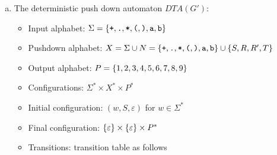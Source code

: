 \begin{solution}
\begin{enumerate}[(a)]

\item The deterministic push down automaton $DTA(G')$:
\begin{itemize}
  \item Input alphabet: $\Sigma = \left\{ \texttt{+}, \texttt{.}, \texttt{*}, \texttt{(}, \texttt{)}, \texttt{a}, \texttt{b} \right\}$
  \item Pushdown alphabet: $X = \Sigma \cup N = \left\{ \texttt{+}, \texttt{.}, \texttt{*}, \texttt{(}, \texttt{)}, \texttt{a}, \texttt{b} \right\} \cup \left\{ S, R, R', T \right\}$
  \item Output alphabet: $P=\left\{ 1,2,3,4,5,6,7,8,9 \right\}$
  \item Configurations: $\Sigma^* \times X^* \times P^*$
  \item Initial configuration: $(w, S, \varepsilon)$ for $w \in \Sigma^*$
  \item Final configuration: $\left\{ \varepsilon \right\} \times \left\{ \varepsilon \right\} \times P^*$
  \item Transitions: transition table as follows
\end{itemize}


\end{enumerate}
\end{solution}
